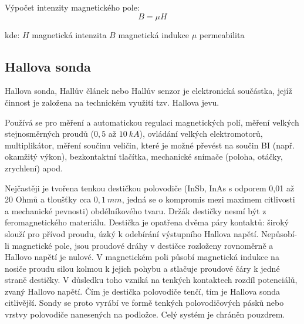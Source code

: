  Výpočet intenzity magnetického pole:  	
		\begin{equation}
  		B = \mu H
  	\end{equation}
  	
  	\hspace*{2cm}kde:\newline
  	\hspace*{4cm}$H$ \dotfill magnetická intenzita\hspace*{4cm}\newline
  	\hspace*{4cm}$B$ \dotfill magnetická indukce\hspace*{4cm}\newline
  	\hspace*{4cm}$\mu$ \dotfill permeabilita\hspace*{4cm}\newline
  	
	\subsection{Hallova sonda}
	\indent\indent
	Hallova sonda, Hallův článek nebo Hallův senzor je elektronická součástka, jejíž činnost je založena na technickém využití tzv. Hallova jevu.

	Používá se pro měření a automatickou regulaci magnetických polí, měření velkých stejnosměrných proudů ($0,5$ až $10~kA$), ovládání velkých elektromotorů, multiplikátor, měření součinu veličin, které je možné převést na součin BI (např. okamžitý výkon), bezkontaktní tlačítka, mechanické snímače (poloha, otáčky, zrychlení) apod.

	Nejčastěji je tvořena tenkou destičkou polovodiče (InSb, InAs s odporem 0,01 až 20 Ohmů a tloušťky cca $0,1~mm$, jedná se o kompromis mezi maximem citlivosti a mechanické pevnosti) obdélníkového tvaru. Držák destičky nesmí být z feromagnetického materiálu. Destička je opatřena dvěma páry kontaktů: široký slouží pro přívod proudu, úzký k odebírání výstupního Hallova napětí. Nepůsobí-li magnetické pole, jsou proudové dráhy v destičce rozloženy rovnoměrně a Hallovo napětí je nulové. V magnetickém poli působí magnetická indukce na nosiče proudu silou kolmou k jejich pohybu a stlačuje proudové čáry k jedné straně destičky. V důsledku toho vzniká na tenkých kontaktech rozdíl potenciálů, zvaný Hallovo napětí. Čím je destička polovodiče tenčí, tím je Hallova sonda citlivější. Sondy se proto vyrábí ve formě tenkých polovodičových pásků nebo vrstvy polovodiče nanesených na podložce. Celý systém je chráněn pouzdrem.
